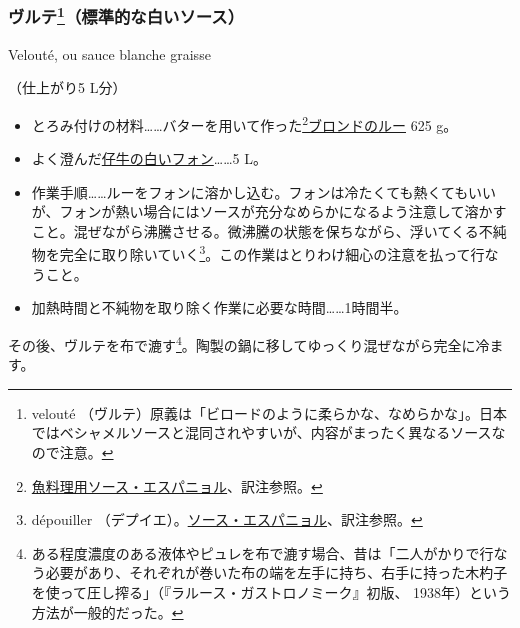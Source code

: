 \begin{recette}
\atoaki{}

\hypertarget{veloute}{%
\subsubsection[ヴルテ（標準的な白いソース）]{\texorpdfstring{ヴルテ\footnote{velouté
  （ヴルテ）原義は「ビロードのように柔らかな、なめらかな」。日本ではベシャメルソースと混同されやすいが、内容がまったく異なるソースなので注意。}（標準的な白いソース）}{ヴルテ（標準的な白いソース）}}\label{veloute}}

\begin{frsubenv}

Velouté, ou sauce blanche graisse

\end{frsubenv}

 
 

（仕上がり5 L分）

\begin{itemize}
\item
  とろみ付けの材料\ldots{}\ldots{}バターを用いて作った\footnote{\protect\hyperlink{sauce-espagnole-maigre}{魚料理用ソース・エスパニョル}、訳注参照。}\protect\hyperlink{roux-blond}{ブロンドのルー}
  625 g。
\item
  よく澄んだ\protect\hyperlink{fonds-blanc-ordinaire}{仔牛の白いフォン}\ldots{}\ldots{}5
  L。
\item
  作業手順\ldots{}\ldots{}ルーをフォンに溶かし込む。フォンは冷たくても熱くてもいいが、フォンが熱い場合にはソースが充分なめらかになるよう注意して溶かすこと。混ぜながら沸騰させる。微沸騰の状態を保ちながら、浮いてくる不純物を完全に取り除いていく\footnote{dépouiller
    （デプイエ）。\protect\hyperlink{sauce-espagnole}{ソース・エスパニョル}、訳注参照。}。この作業はとりわけ細心の注意を払って行なうこと。
\item
  加熱時間と不純物を取り除く作業に必要な時間\ldots{}\ldots{}1時間半。
\end{itemize}

その後、ヴルテを布で漉す\footnote{ある程度濃度のある液体やピュレを布で漉す場合、昔は「二人がかりで行なう必要があり、それぞれが巻いた布の端を左手に持ち、右手に持った木杓子を使って圧し搾る」（『ラルース・ガストロノミーク』初版、
  1938年）という方法が一般的だった。}。陶製の鍋に移してゆっくり混ぜながら完全に冷ます。


\end{recette}
